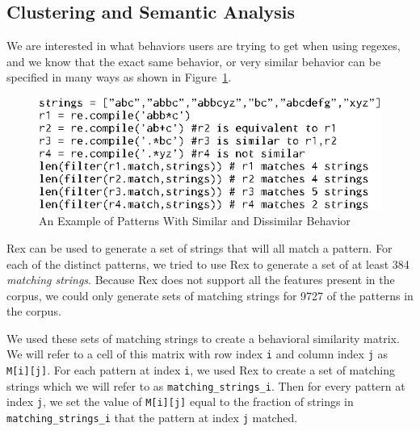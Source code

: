 
\subsection{Clustering and Semantic Analysis}
We are interested in what behaviors users are trying to get when using regexes, and we know that the exact same behavior, or very similar behavior can be specified in many ways as shown in Figure~\ref{fig:equivalentPatterns}.

\begin{figure}[htb]
\centering
\includegraphics[width=\columnwidth]{../illustrations/equivalentPatterns.eps}
\caption{An Example of Patterns With Similar and Dissimilar Behavior}
\label{fig:equivalentPatterns}
\end{figure}

Rex can be used to generate a set of strings that will all match a pattern.  For each of the  distinct patterns, we tried to use Rex to generate a set of at least 384 \emph{matching strings}.  Because Rex does not support all the features present in the corpus, we could only generate sets of matching strings for 9727 of the  patterns in the corpus.

We used these sets of matching strings to create a behavioral similarity matrix.  We will refer to a cell of this matrix with row index {\tt i} and column index {\tt j} as {\tt M[i][j]}.  For each pattern at index {\tt i}, we used Rex to create a set of matching strings which we will refer to as {\tt matching\_strings\_i}.  Then for every pattern at index {\tt j}, we set the value of {\tt M[i][j]} equal to the fraction of strings in {\tt matching\_strings\_i} that the pattern at index {\tt j} matched.

